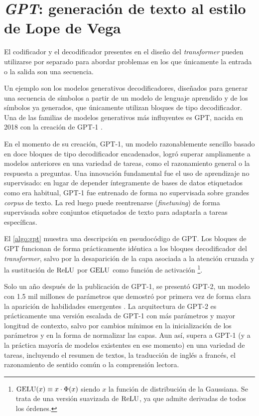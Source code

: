\chapter{\textit{GPT}: generación de texto al estilo de Lope de Vega}
El codificador y el decodificador presentes en el diseño del \textit{transformer} pueden utilizarse por separado para abordar problemas en los que únicamente la entrada o la salida son una secuencia. 

Un ejemplo son los modelos generativos decodificadores, diseñados para generar una secuencia de símbolos a partir de un modelo de lenguaje aprendido y de los símbolos ya generados, que únicamente utilizan bloques de tipo decodificador. Una de las familias de modelos generativos más influyentes es GPT, nacida en 2018 con la creación de GPT-1 \cite{radford2018improving}.

En el momento de su creación, GPT-1, un modelo razonablemente sencillo basado en doce bloques de tipo decodificador encadenados, logró superar ampliamente a modelos anteriores en una variedad de tareas, como el razonamiento general o la respuesta a preguntas. Una innovación fundamental fue el uso de aprendizaje no supervisado: en lugar de depender íntegramente de bases de datos etiquetados como era habitual, GPT-1 fue entrenado de forma no supervisada sobre grandes \textit{corpus} de texto. La red luego puede reentrenarse (\textit{finetuning}) de forma supervisada sobre conjuntos etiquetados de texto para adaptarla a tareas específicas.

El \cref{algo:gpt} muestra una descripción en pseudocódigo de GPT. Los bloques de GPT funcionan de forma prácticamente idéntica a los bloques decodificador del \textit{transformer}, salvo por la desaparición de la capa asociada a la atención cruzada y la sustitución de $\operatorname{ReLU}$ por $\operatorname{GELU}$ como función de activación \footnote{$\operatorname{GELU}(x) \equiv x \cdot \Phi(x)$ siendo $x$ la función de distribución de la Gaussiana. Se trata de una versión suavizada de $\operatorname{ReLU}$, ya que admite derivadas de todos los órdenes.}.

Solo un año después de la publicación de GPT-1, se presentó GPT-2, un modelo con 1.5 mil millones de parámetros que demostró por primera vez de forma clara la aparición de habilidades emergentes \cite{radford2019language}. La arquitectura de GPT-2 es prácticamente una versión escalada de GPT-1 con más parámetros y mayor longitud de contexto, salvo por cambios mínimos en la inicialización de los parámetros y en la forma de normalizar las capas. Aun así, supera a GPT-1 (y a la práctica mayoría de modelos existentes en ese momento) en una variedad de tareas, incluyendo el resumen de textos, la traducción de inglés a francés, el razonamiento de sentido común o la comprensión lectora.

